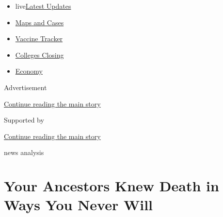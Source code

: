 \begin{itemize}
\tightlist
\item
  live\href{https://www.nytimes3xbfgragh.onion/2020/08/20/world/coronavirus-covid.html?name=styln-coronavirus-national\&region=TOP_BANNER\&variant=undefined\&block=storyline_menu_recirc\&action=click\&pgtype=Article\&impression_id=52c561f1-e38e-11ea-81d8-93a7ced789f1}{Latest
  Updates}
\item
  \href{https://www.nytimes3xbfgragh.onion/interactive/2020/us/coronavirus-us-cases.html?name=styln-coronavirus-national\&region=TOP_BANNER\&variant=undefined\&block=storyline_menu_recirc\&action=click\&pgtype=Article\&impression_id=52c58900-e38e-11ea-81d8-93a7ced789f1}{Maps
  and Cases}
\item
  \href{https://www.nytimes3xbfgragh.onion/interactive/2020/science/coronavirus-vaccine-tracker.html?name=styln-coronavirus-national\&region=TOP_BANNER\&variant=undefined\&block=storyline_menu_recirc\&action=click\&pgtype=Article\&impression_id=52c58901-e38e-11ea-81d8-93a7ced789f1}{Vaccine
  Tracker}
\item
  \href{https://www.nytimes3xbfgragh.onion/2020/08/19/us/colleges-closing-covid.html?name=styln-coronavirus-national\&region=TOP_BANNER\&variant=undefined\&block=storyline_menu_recirc\&action=click\&pgtype=Article\&impression_id=52c58902-e38e-11ea-81d8-93a7ced789f1}{Colleges
  Closing}
\item
  \href{https://www.nytimes3xbfgragh.onion/live/2020/08/20/business/stock-market-today-coronavirus?name=styln-coronavirus-national\&region=TOP_BANNER\&variant=undefined\&block=storyline_menu_recirc\&action=click\&pgtype=Article\&impression_id=52c58903-e38e-11ea-81d8-93a7ced789f1}{Economy}
\end{itemize}

Advertisement

\protect\hyperlink{after-top}{Continue reading the main story}

Supported by

\protect\hyperlink{after-sponsor}{Continue reading the main story}

news analysis

\hypertarget{your-ancestors-knew-death-in-ways-you-never-will}{%
\section{Your Ancestors Knew Death in Ways You Never
Will}\label{your-ancestors-knew-death-in-ways-you-never-will}}

